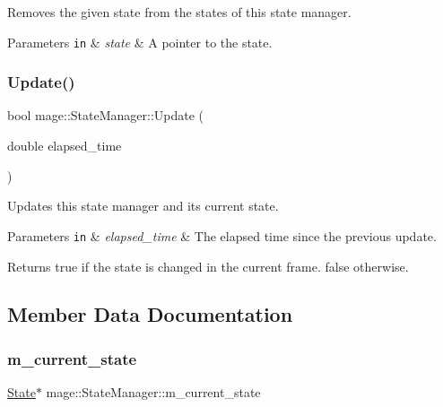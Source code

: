 Removes the given state from the states of this state manager.


\begin{DoxyParams}[1]{Parameters}
\mbox{\tt in}  & {\em state} & A pointer to the state. \\
\hline
\end{DoxyParams}
\hypertarget{classmage_1_1_state_manager_a48498596d478d107621b1752104e02e3}{}\label{classmage_1_1_state_manager_a48498596d478d107621b1752104e02e3} 
\subsubsection{\texorpdfstring{Update()}{Update()}}
{\footnotesize\ttfamily bool mage\+::\+State\+Manager\+::\+Update (\begin{DoxyParamCaption}\item[{double}]{elapsed\+\_\+time }\end{DoxyParamCaption})}

Updates this state manager and its current state.


\begin{DoxyParams}[1]{Parameters}
\mbox{\tt in}  & {\em elapsed\+\_\+time} & The elapsed time since the previous update. \\
\hline
\end{DoxyParams}
\begin{DoxyReturn}{Returns}
{\ttfamily true} if the state is changed in the current frame. {\ttfamily false} otherwise. 
\end{DoxyReturn}


\subsection{Member Data Documentation}
\hypertarget{classmage_1_1_state_manager_a737122d580b709e0d122db4a6e1d9006}{}\label{classmage_1_1_state_manager_a737122d580b709e0d122db4a6e1d9006} 
\subsubsection{\texorpdfstring{m\+\_\+current\+\_\+state}{m\_current\_state}}
{\footnotesize\ttfamily \hyperlink{classmage_1_1_state}{State}$\ast$ mage\+::\+State\+Manager\+::m\+\_\+current\+\_\+state\hspace{0.3cm}{\ttfamily [private]}}

